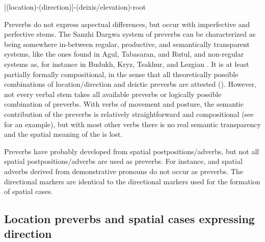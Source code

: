\begin{exe}
	\ex	\mbox{[(location)-(direction)]-(deixis/elevation)-root}	\label{ex:preverb affixation order}
\end{exe}

Preverbs do not express aspectual differences, but occur with imperfective and perfective stems. The Sanzhi Dargwa system of preverbs can be characterized as being somewhere in-between regular, productive, and semantically transparent systems, like the ones found in Agul, Tabasaran, and Rutul, and non-regular systems as, for instance in Budukh, Kryz, Tsakhur, and Lezgian \citep{Tatevosov2000, Nichols2003, Ganenkov2007}. It is at least partially formally compositional, in the sense that all theoretically possible combinations of location/direction and deictic preverbs are attested (). However, not every verbal stem takes all available preverbs or logically possible combination of preverbs. With verbs of movement and posture, the semantic contribution of the preverbs is relatively straightforward and compositional (see  for an example), but with most other verbs there is no real semantic transparency and the spatial meaning of the  is lost.

Preverbs have probably developed from spatial postpositions/adverbs, but not all spatial postpositions/adverbs are used as preverbs. For instance,   and spatial adverbs derived from demonstrative pronouns do not occur as preverbs. The directional markers are identical to the directional markers used for the formation of spatial cases.



\subsection{Location preverbs and spatial cases expressing direction}
\label{ssec:Location preverbs and spatial cases expressing direction}


